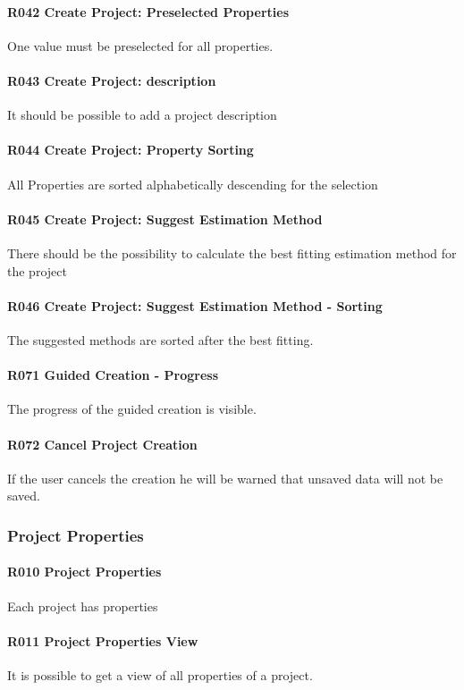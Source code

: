 \paragraph{R042 Create Project: Preselected Properties}
One value must be preselected for all properties.
\paragraph{R043 Create Project: description}
It should be possible to add a project description
\paragraph{R044 Create Project: Property Sorting}
All Properties are sorted alphabetically descending for the selection
\paragraph{R045 Create Project: Suggest Estimation Method}
There should be the possibility to calculate the best fitting estimation method for the project
\paragraph{R046 Create Project: Suggest Estimation Method - Sorting}
The suggested methods are sorted after the best fitting.
\paragraph{R071 Guided Creation - Progress}
The progress of the guided creation is visible.
\paragraph{R072 Cancel Project Creation}
If the user cancels the creation he will be warned that unsaved data will not be saved.

\subsubsection{Project Properties}
\paragraph{R010 Project Properties}
Each project has properties
\paragraph{R011 Project Properties View}
It is possible to get a view of all properties of a project.
